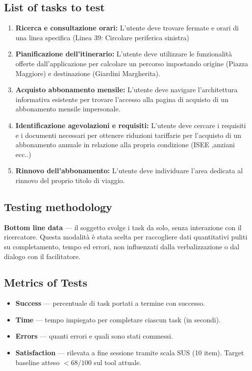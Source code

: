 ﻿\documentclass[11pt,a4paper]{article}
\begin{document}
\vspace{0.2cm}

\subsection*{List of tasks to test}
\begin{tcolorbox}[base]
\begin{enumerate}[leftmargin=*,itemsep=4pt]
  \item \textbf{Ricerca e consultazione orari:} L'utente deve
  trovare fermate e orari di una linea specifica (Linea 39: Circolare periferica sinistra)
  \item \textbf{Pianificazione dell'itinerario:} L'utente deve utilizzare le funzionalità offerte dall'applicazione per calcolare un percorso impostando origine (Piazza Maggiore) e destinazione (Giardini Margherita).
  \item \textbf{Acquisto abbonamento mensile:} L'utente
  deve navigare l'architettura informativa esistente per
  trovare l'accesso alla pagina di acquisto di un abbonamento
  mensile impersonale.
  \item \textbf{Identificazione agevolazioni e requisiti:}
  L'utente deve cercare i requisiti  e i documenti necessari per ottenere riduzioni tariffarie per l'acquisto di un
  abbonamento annuale in relazione alla propria condizione (ISEE ,anziani ecc..)
  \item \textbf{Rinnovo dell'abbonamento:} L'utente
  deve individuare l'area dedicata al rinnovo del proprio titolo di viaggio.
\end{enumerate}
\end{tcolorbox}

\vspace{0.2cm}

\subsection*{Testing methodology}
\textbf{Bottom line data} --- il soggetto
svolge i task da solo, senza interazione con il ricercatore.
Questa modalità è stata scelta per raccogliere dati
quantitativi puliti su completamento, tempo ed errori,
non influenzati dalla verbalizzazione o dal dialogo con
il facilitatore.

\vspace{0.2cm}

\subsection*{Metrics of Tests}
\begin{itemize}[leftmargin=*,itemsep=3pt]
  \item \textbf{Success} --- percentuale di task portati
  a termine con successo.
  \item \textbf{Time} --- tempo impiegato per completare
  ciascun task (in secondi).
  \item \textbf{Errors} --- quanti errori e quali sono stati commessi.
  \item \textbf{Satisfaction} --- rilevata a fine sessione
  tramite scala SUS (10 item). Target baseline atteso
  $< 68/100$ sul tool attuale.
\end{itemize}
\end{document}
